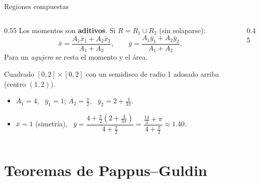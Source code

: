 \documentclass[10pt,aspectratio=169]{beamer}
\begin{document}
\begin{frame}{Regiones compuestas}
  \begin{columns}
    \begin{column}{0.55\textwidth}
      Los momentos son \textbf{aditivos}. Si $R=R_1\cup R_2$ (sin solaparse):
      \[ \bar x=\frac{A_1\bar x_1+A_2\bar x_2}{A_1+A_2},\qquad \bar y=\frac{A_1\bar y_1+A_2\bar y_2}{A_1+A_2}. \]
      Para un \emph{agujero} se resta el momento y el área.
      \begin{ejemplo}[6]
        Cuadrado $[0,2]\times[0,2]$ con un semidisco de radio 1 adosado arriba (centro $(1,2)$).
        \begin{itemize}
          \item $A_1=4$, \ $\bar y_1=1$; \quad $A_2=\frac\pi2$, \ $\bar y_2=2+\frac4{3\pi}$.
          \item $\bar x=1$ (simetría), \ $\bar y=\dfrac{4+\frac\pi2\left(2+\frac4{3\pi}\right)}{4+\frac\pi2}=\dfrac{\frac{14}3+\pi}{4+\frac\pi2}\approx1.40$.
        \end{itemize}
      \end{ejemplo}
    \end{column}
    \begin{column}{0.45\textwidth}
      \centering
    \end{column}
  \end{columns}
\end{frame}

\section{Teoremas de Pappus--Guldin}
\end{document}
